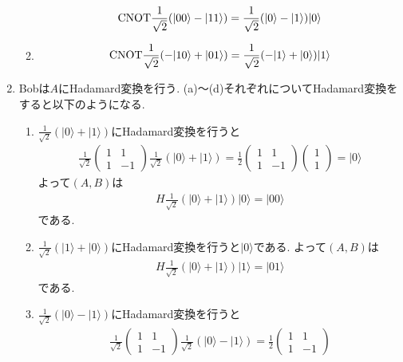\documentclass[uplatex,a4j,11pt,dvipdfmx]{jsarticle}
\begin{document}
\begin{enumerate}
\begin{enumerate}
\begin{align}
      {\rm CNOT}\frac{1}{\sqrt{2}}(|00\rangle-|11\rangle)=\frac{1}{\sqrt{2}}(|0\rangle-|1\rangle)|0\rangle
    \end{align}
    \item \begin{align}
      {\rm CNOT}\frac{1}{\sqrt{2}}(-|10\rangle+|01\rangle)=\frac{1}{\sqrt{2}}(-|1\rangle+|0\rangle)|1\rangle
    \end{align}
  \end{enumerate}
  \newpage
  \item Bobは$A$にHadamard変換を行う.
  (a)〜(d)それぞれについてHadamard変換をすると以下のようになる.
  \begin{enumerate}
    \item $\frac{1}{\sqrt{2}}(|0\rangle+|1\rangle)$にHadamard変換を行うと
    \begin{align}
      \frac{1}{\sqrt{2}}\begin{pmatrix}
        1&1\\1&-1
      \end{pmatrix}
      \frac{1}{\sqrt{2}}(|0\rangle+|1\rangle)=\frac{1}{2}\begin{pmatrix}
        1&1\\1&-1
      \end{pmatrix}\begin{pmatrix}
        1\\1
      \end{pmatrix}=|0\rangle
    \end{align}
    よって$(A,B)$は
    \begin{align}
      H\frac{1}{\sqrt{2}}(|0\rangle+|1\rangle)|0\rangle=|00\rangle
    \end{align}
    である.
    \item $\frac{1}{\sqrt{2}}(|1\rangle+|0\rangle)$にHadamard変換を行うと$|0\rangle$である.
    よって$(A,B)$は
    \begin{align}
      H\frac{1}{\sqrt{2}}(|0\rangle+|1\rangle)|1\rangle=|01\rangle
    \end{align}
    である.
    \item $\frac{1}{\sqrt{2}}(|0\rangle-|1\rangle)$にHadamard変換を行うと
    \begin{align}
      \frac{1}{\sqrt{2}}\begin{pmatrix}
        1&1\\1&-1
      \end{pmatrix}
      \frac{1}{\sqrt{2}}(|0\rangle-|1\rangle)=\frac{1}{2}\begin{pmatrix}
        1&1\\1&-1

\end{pmatrix}
\end{align}
\end{enumerate}
\end{enumerate}
\end{document}
